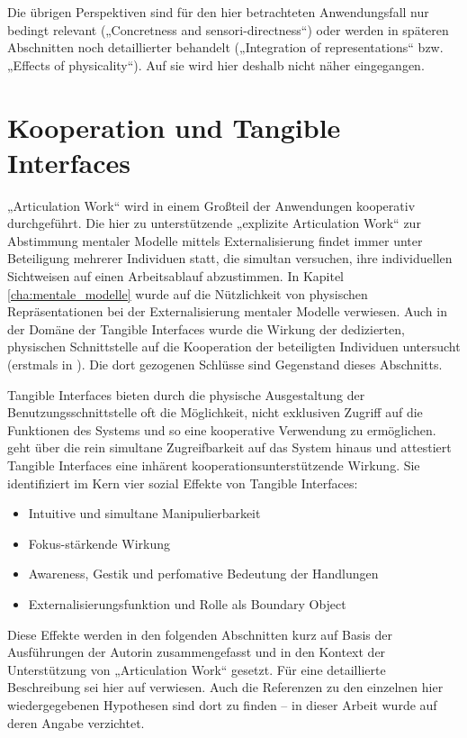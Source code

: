 Die übrigen Perspektiven sind für den hier betrachteten Anwendungsfall nur bedingt relevant („Concretness and sensori-directness“) oder werden in späteren Abschnitten noch detaillierter behandelt („Integration of representations“ bzw. „Effects of physicality“). Auf sie wird hier deshalb nicht näher eingegangen.


\section{Kooperation und Tangible Interfaces} %
\label{sec:kooperation_und_tangible_interfaces}

„Articulation Work“ wird in einem Großteil der Anwendungen kooperativ durchgeführt. Die hier zu unterstützende „explizite Articulation Work“ zur Abstimmung mentaler Modelle mittels Externalisierung findet immer unter Beteiligung mehrerer Individuen statt, die simultan versuchen, ihre individuellen Sichtweisen auf einen Arbeitsablauf abzustimmen. In Kapitel \ref{cha:mentale_modelle} wurde auf die Nützlichkeit von physischen Repräsentationen bei der Externalisierung mentaler Modelle verwiesen. Auch in der Domäne der Tangible Interfaces wurde die Wirkung der dedizierten, physischen Schnittstelle auf die Kooperation der beteiligten Individuen untersucht (erstmals in \citep{Hornecker01}). Die dort gezogenen Schlüsse sind Gegenstand dieses Abschnitts. 

Tangible Interfaces bieten durch die physische Ausgestaltung der Benutzungsschnittstelle oft die Möglichkeit, nicht exklusiven Zugriff auf die Funktionen des Systems und so eine kooperative Verwendung zu ermöglichen. \citet{Hornecker04} geht über die rein simultane Zugreifbarkeit auf das System hinaus und attestiert Tangible Interfaces eine inhärent kooperationsunterstützende Wirkung. Sie identifiziert im Kern vier sozial Effekte von Tangible Interfaces:
\begin{itemize}
	\item Intuitive und simultane Manipulierbarkeit
	\item Fokus-stärkende Wirkung
	\item Awareness, Gestik und perfomative Bedeutung der Handlungen
	\item Externalisierungsfunktion und Rolle als Boundary Object
\end{itemize}

Diese Effekte werden in den folgenden Abschnitten kurz auf Basis der Ausführungen der Autorin zusammengefasst und in den Kontext der Unterstützung von „Articulation Work“ gesetzt. Für eine detaillierte Beschreibung sei hier auf \citep[][S. 147-212]{Hornecker04} verwiesen. Auch die Referenzen zu den einzelnen hier wiedergegebenen Hypothesen sind dort zu finden -- in dieser Arbeit wurde auf deren Angabe verzichtet. 

